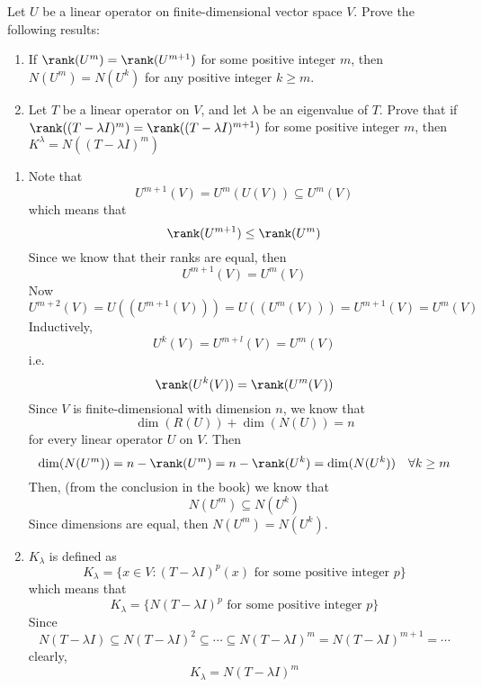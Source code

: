 \begin{homeworkProblem}

Let $U$ be a linear operator on finite-dimensional vector space $V$. Prove the following results:

\begin{enumerate}
  \item If $\rank(U^m) = \rank(U^{m+1})$ for some positive integer $m$, then $N(U^m) = N(U^{k})$ for any positive integer $k \geq m$.
  \item Let $T$ be a linear operator on $V$, and let $\lambda$ be an eigenvalue of $T$. Prove that if $\rank((T - \lambda I)^m) = \rank((T - \lambda I)^{m+1})$ for some positive integer $m$, then $K^\lambda = N((T - \lambda I)^m)$
\end{enumerate}

\solution

\begin{enumerate}
  \item Note that
\[
U^{m+1}(V) = U^m (U(V)) \subseteq U^m(V)
\] which means that
\[
\rank(U^{m+1}) \leq \rank(U^m)
\] Since we know that their ranks are equal, then
\[
U^{m+1}(V) = U^m(V)
\] Now
\[
U^{m+2}(V) = U((U^{m+1}(V))) = U((U^{m}(V))) = U^{m+1}(V) = U^m(V)
\] Inductively,
\[
U^k(V) = U^{m+l}(V) = U^m(V)
\] i.e.
\[
\rank(U^k(V)) = \rank(U^m(V))
\] Since $V$ is finite-dimensional with dimension $n$, we know that
\[
\dim(R(U)) + \dim(N(U)) = n
\] for every linear operator $U$ on $V$. Then
\[
\dim(N(U^m)) = n - \rank(U^m) = n - \rank(U^k) = \dim(N(U^k)) \quad \forall k \geq m
\]
  Then, (from the conclusion in the book) we know that
\[
N(U^m) \subseteq N(U^k)
\] Since dimensions are equal, then $N(U^m) = N(U^k)$.
  \item $K_\lambda$ is defined as
\[
K_\lambda = \{x \in V : (T-\lambda I)^p(x) \text{ for some positive integer }p\}
\] which means that
\[
K_\lambda = \{N(T-\lambda I)^p \text{ for some positive integer }p\}
\] Since
\[
N(T-\lambda I) \subseteq N(T-\lambda I)^2 \subseteq \cdots \subseteq N(T-\lambda I)^m = N(T-\lambda I)^{m+1} = \cdots
\] clearly,
\[
K_\lambda = N(T-\lambda I)^m
\]

\end{enumerate}


\end{homeworkProblem}
